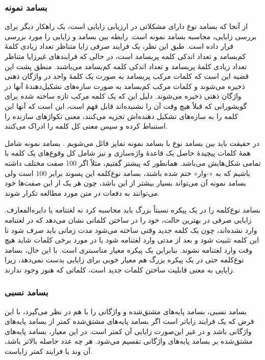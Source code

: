 \documentclass[12pt,onecolumn,a4paper]{article}
\begin{document}
    \subsubsection{بسامد نمونه}
    از آنجا که بسامد نوع‌ دارای مشکلاتی در ارزیابی زایایی است، یک راهکار دیگر برای بررسی زایایی، محاسبه بسامد نمونه است.  رابطه بین بسامد و زایایی را مورد بررسی قرار داده است. طبق این نظر، یک فرایند صرفی زایا متناظر تعداد زیادی کلمۀ کم‌بسامد و تعداد اندکی کلمه پربسامد است، در حالی که فرایندهای غیرزایا متناظر تعداد زیادی کلمۀ پربسامد و تعداد اندکی کلمه کم‌بسامد می‌باشند. منطق پشت این قضیه این است که کلمات مرکب پربسامد به صورت یک کلمۀ واحد در واژگان ذهنی ذخیره می‌شوند و کلمات مرکب کم‌بسامد به صورت سازه‌های تشکیل‌دهندۀ آنها در واژگان ذهنی ذخیره می‌شوند. دلیل این که یک کلمه مرکب تازه ساخته شده  برای گویشورانی که قبلاً هیچ وقت آن را نشنیده‌اند قابل فهم است، این است که آنها این کلمه را به سازه‌های تشکیل دهنده‌اش تجزیه می‌کنند، معنی تکواژهای سازنده را استنباط کرده و سپس معنی کل کلمه را ادراک می‌کنند.
    \par
    در حقیقت باید بین بسامد نوع‌ با بسامد نمونه تمایز قائل می‌شویم . بسامد نمونه شامل همهٔ کلمات پیچیدهٔ حاصل یک قاعدهٔ واژه‌سازی و نیز شامل کل وقوع‌های یک کلمه با تمامی شکل‌هایش می‌باشد. همانطور که پیشتر گفتیم، مثلاً اگر 100 صفت مختلف داشته باشیم که به «-وار» ختم شده باشند، بسامد نوع‌کلمه این پسوند برابر 100 است ولی بسامد نمونه آن می‌تواند بسیار بیشتر از این باشد، چون هر یک از این صفت‌ها خود می‌توانند به دفعات در متن مورد مطالعه تکرار شوند.
    \par
    بسامد نوع‌کلمه را در یک پیکره نسبتاً بزرگ باید محاسبه کرد نه لغتنامه یا دایره‌المعارف. زایایی صرفی در بهترین حالت، خود را در ساختن کلماتی نشان می‌دهد که در لغتنامه وارد نشده‌اند، چون یک کلمه جدید وقتی ساخته می‌شود مدت زمانی باید صرف شود تا این کلمه تثبیت شود و بعد از مدتی وارد لغتنامه ‌شود یا در مورد برخی کلمات شاید هیچ وقت وارد لغتنامه نشوند. بنابراین یک پیکره معیار مناسبتری است. با این حال، بسامد نوع‌کلمه حتی در یک پیکره بزرگ هم معیار خوبی برای زایایی بدست نمی‌دهد، زیرا زایایی به معنی قابلیت ساختن کلمات جدید است، کلماتی که هنوز وجود ندارند.

    \subsubsection{بسامد نسبی}
    بسامد نسبی، بسامد پایه‌های مشتق‌شده و واژگانی را با هم در نظر می‌گیرد، با این فرض که یک فرایند زایاتر است اگر بسامد پایه‌های مشتق‌شده کمتر از بسامد پایه‌های واژگانی باشد و در غیر این‌صورت زایایی آن کمتر است. در این معیار، بسامد پایه‌های مشتق‌شده بر بسامد پایه‌های واژگانی تقسیم می‌شود. هر چه عدد حاصله بالاتر باشد، آن وند یا فرایند کمتر زایاست.
\end{document}
